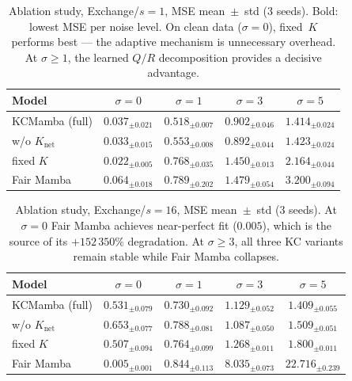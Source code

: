 \begin{table}[H]
  \centering
  \small
  \begin{tabular}{|l|c|c|c|c|}
    \hline
    \textbf{Model} & $\sigma{=}0$ & $\sigma{=}1$ & $\sigma{=}3$ & $\sigma{=}5$ \\
    \hline\hline
    KCMamba (full)     & $0.037_{\pm0.021}$ & $\mathbf{0.518}_{\pm0.007}$ & $0.902_{\pm0.046}$ & $\mathbf{1.414}_{\pm0.024}$ \\
    w/o $K_\text{net}$ & $0.033_{\pm0.015}$ & $0.553_{\pm0.008}$ & $\mathbf{0.892}_{\pm0.044}$ & $1.423_{\pm0.024}$ \\
    fixed $K$          & $\mathbf{0.022}_{\pm0.005}$ & $0.768_{\pm0.035}$ & $1.450_{\pm0.013}$ & $2.164_{\pm0.044}$ \\
    Fair Mamba         & $0.064_{\pm0.018}$ & $0.789_{\pm0.202}$ & $1.479_{\pm0.054}$ & $3.200_{\pm0.094}$ \\
    \hline
  \end{tabular}
  \caption{Ablation study, Exchange/$s{=}1$, MSE mean~$\pm$~std (3 seeds).
           Bold: lowest MSE per noise level.
           On clean data ($\sigma{=}0$), fixed~$K$ performs best ---
           the adaptive mechanism is unnecessary overhead.
           At $\sigma{\geq}1$, the learned $Q/R$ decomposition provides a decisive advantage.}
  \label{tab:ablation_s1}
\end{table}

\begin{table}[H]
  \centering
  \small
  \begin{tabular}{|l|c|c|c|c|}
    \hline
    \textbf{Model} & $\sigma{=}0$ & $\sigma{=}1$ & $\sigma{=}3$ & $\sigma{=}5$ \\
    \hline\hline
    KCMamba (full)     & $0.531_{\pm0.079}$ & $\mathbf{0.730}_{\pm0.092}$ & $1.129_{\pm0.052}$ & $\mathbf{1.409}_{\pm0.055}$ \\
    w/o $K_\text{net}$ & $0.653_{\pm0.077}$ & $0.788_{\pm0.081}$ & $\mathbf{1.087}_{\pm0.050}$ & $1.509_{\pm0.051}$ \\
    fixed $K$          & $0.507_{\pm0.094}$ & $0.764_{\pm0.099}$ & $1.268_{\pm0.011}$ & $1.800_{\pm0.011}$ \\
    Fair Mamba         & $\mathbf{0.005}_{\pm0.001}$ & $0.844_{\pm0.113}$ & $8.035_{\pm0.073}$ & $22.716_{\pm0.239}$ \\
    \hline
  \end{tabular}
  \caption{Ablation study, Exchange/$s{=}16$, MSE mean~$\pm$~std (3 seeds).
           At $\sigma{=}0$ Fair Mamba achieves near-perfect fit ($0.005$),
           which is the source of its $+152\,350\%$ degradation.
           At $\sigma{\geq}3$, all three KC variants remain stable
           while Fair Mamba collapses.}
  \label{tab:ablation_s16}
\end{table}

